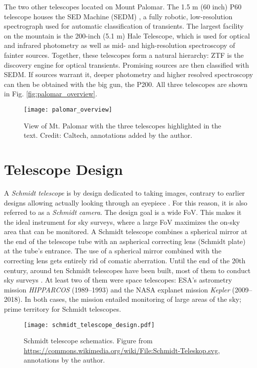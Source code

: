 The two other telescopes located on Mount Palomar. The 1.5 m (60 inch) P60 telescope houses the SED Machine (SEDM) , a fully robotic, low-resolution spectrograph used for automatic classification of transients. The largest facility on the mountain is the 200-inch (5.1 m) Hale Telescope, which is used for optical and infrared photometry as well as mid- and high-resolution spectroscopy of fainter sources. Together, these telescopes form a natural hierarchy: ZTF is the discovery engine for optical transients. Promising sources are then classified with SEDM. If sources warrant it, deeper photometry and higher resolved spectroscopy can then be obtained with the big gun, the P200. All three telescopes are shown in Fig. \ref{fig:palomar_overview}.

\begin{figure*}[]
    \texttt{[image: palomar\_overview]}
    \caption[View of Mt. Palomar]{View of Mt. Palomar with the three telescopes highlighted in the text. Credit: Caltech, annotations added by the author.}
\end{figure*}

\section{Telescope Design}
A \textit{Schmidt telescope} is by design dedicated to taking images, contrary to earlier designs allowing actually looking through an eyepiece . For this reason, it is also referred to as a \textit{Schmidt camera}. The design goal is a wide FoV. This makes it the ideal instrument for sky surveys, where a large FoV maximizes the on-sky area that can be monitored. A Schmidt telescope combines a spherical mirror at the end of the telescope tube with an aspherical correcting lens (Schmidt plate) at the tube's entrance. The use of a spherical mirror combined with the correcting lens gets entirely rid of comatic aberration. Until the end of the 20th century, around ten Schmidt telescopes have been built, most of them to conduct sky surveys . At least two of them were space telescopes: ESA's astrometry mission \textit{HIPPARCOS}  (1989--1993) and the NASA explanet mission \textit{Kepler}  (2009--2018). In both cases, the mission entailed monitoring of large areas of the sky; prime territory for Schmidt telescopes.

\begin{figure}[]
    \texttt{[image: schmidt\_telescope\_design.pdf]}
    \caption[Schmidt telescope schematics]{Schmidt telescope schematics. Figure from \url{https://commons.wikimedia.org/wiki/File:Schmidt-Teleskop.svg}, annotations by the author.}
\end{figure}

